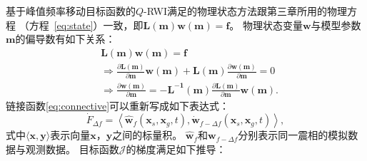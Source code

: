 基于峰值频率移动目标函数的$Q$-RWI满足的物理状态方法跟第三章所用的物理方程
（方程~\ref{eq:state}）一致，即$\mathbf{L(m)}\mathbf{w(m)}=\mathbf{f}$。
物理状态变量$\mathbf{w}$与模型参数$\mathbf{m}$的偏导数有如下关系：
\begin{equation}
	\begin{aligned}
		&\mathbf{L(m)}\mathbf{w(m)}=\mathbf{f} \\
		&\Rightarrow \frac{\partial \mathbf{L(m)}}{\partial\mathbf{m}}\mathbf{w(m)}+
		\mathbf{L(m)}\frac{\partial\mathbf{w(m)}}{\partial\mathbf{m}}=0 \\
		&\Rightarrow \frac{\partial\mathbf{w(m)}}{\partial\mathbf{m}}=
		-\mathbf{L^{-1}(m)}\frac{\partial \mathbf{L(m)}}{\partial\mathbf{m}}\mathbf{w(m)}.
	\end{aligned}
	\label{eq:ad_state}
\end{equation}
链接函数\ref{eq:connective}可以重新写成如下表达式：
\begin{equation}
	\dot{F}_{\Delta f}=\left\langle \hat{\mathbf{w}}_f(\mathbf{x}_s,\mathbf{x}_g,t),
	\dot{\mathbf{w}}_{f-\Delta f}(\mathbf{x}_s,\mathbf{x}_g,t) \right\rangle,
\end{equation}
式中$\langle \mathbf{x},\mathbf{y}\rangle$表示向量$\mathbf{x}$，$\mathbf{y}$之间的标量积。
$\hat{\mathbf{w}}_f$和$\mathbf{w}_{f-\Delta f}$分别表示同一震相的模拟数据与观测数据。
目标函数$\mathcal{J}$的梯度满足如下推导：
\newpage
